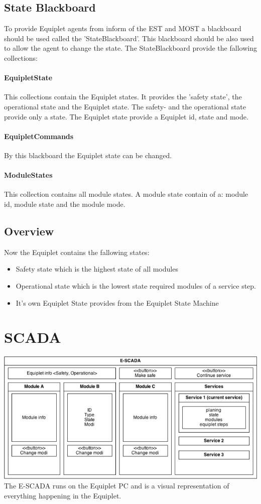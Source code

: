 \documentclass[12pt,a4paper]{report}
\begin{document}
\subsection{State Blackboard}
To provide Equiplet agents from inform of the EST and MOST a blackboard should be used called the 'StateBlackboard'. This blackboard should be also used to allow the agent to change the state. The StateBlackboard provide the fallowing collections:
\paragraph{EquipletState}This collections contain the Equiplet states. It provides the 'safety state', the operational state and the Equiplet state. The safety- and the operational state provide only a state. The Equiplet state provide a Equiplet id, state and mode. 
\paragraph{EquipletCommands}By this blackboard the Equiplet state can be changed.
\paragraph{ModuleStates}This collection contains all module states. A module state contain of a: module id, module state and the module mode.

\subsection{Overview}
Now the Equiplet contains the fallowing states:
\begin{itemize}
\item Safety state which is the highest state of all modules
\item Operational state which is the lowest state required modules of a service step.
\item It's own Equiplet State provides from the Equiplet State Machine
\end{itemize}

\section{SCADA}
\includegraphics[width=1\textwidth]{pictures/SCADA.png}
The E-SCADA runs on the Equiplet PC and is a visual representation of everything happening in the Equiplet. 
\end{document}
